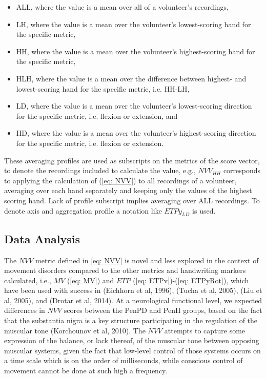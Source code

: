 \begin{itemize}
\item ALL, where the value is a mean over all of a volunteer's recordings,
\item LH, where the value is a mean over the volunteer's lowest-scoring hand for the specific metric,
\item HH, where the value is a mean over the volunteer's highest-scoring hand for the specific metric,
\item HLH, where the value is a mean over the difference between highest- and lowest-scoring hand for the specific metric, i.e. HH-LH,
\item LD, where the value is a mean over the volunteer's lowest-scoring direction for the specific metric, i.e. flexion or extension, and
\item HD, where the value is a mean over the volunteer's highest-scoring direction for the specific metric, i.e. flexion or extension.
\end{itemize}

These averaging profiles are used as subscripts on the metrics of the score vector, to denote the recordings included to calculate the value, e.g., $NVV_{HH}$ corresponds to applying the calculation of (\ref{eq: NVV}) to all recordings of a volunteer, averaging over each hand separately and keeping only the values of the highest scoring hand. Lack of profile subscript implies averaging over ALL recordings. To denote axis and aggregation profile a notation like $ETPy_{LD}$ is used. 

\subsection{Data Analysis}
\label{subsec:PenCTAnalysis}
The $NVV$ metric defined in \ref{eq: NVV} is novel and less explored in the context of movement disorders compared to the other metrics and handwriting markers calculated, i.e., $MV$ (\ref{eq: MV}) and $ETP$ (\ref{eq: ETPv})-(\ref{eq: ETPyRot}), which have been used with success in (Eichhorn et al, 1996), (Tucha et al, 2005), (Liu et al, 2005), and (Drotar et al, 2014). At a neurological functional level, we expected differences in $NVV$ scores between the \gls{PenPD} and \gls{PenH} groups, based on the fact that the substantia nigra is a key structure participating in the regulation of the muscular tone (Korchounov et al, 2010). The $NVV$ attempts to capture some expression of the balance, or lack thereof, of the muscular tone between opposing muscular systems, given the fact that low-level control of those systems occurs on a time scale which is on the order of milliseconds, while conscious control of movement cannot be done at such high a frequency. 

